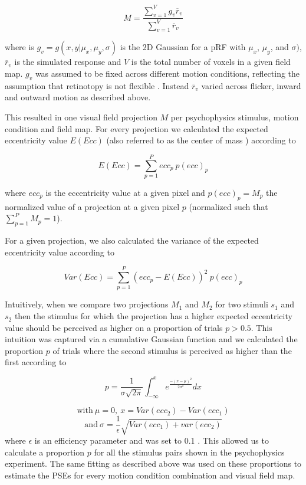 \begin{equation}
M = \frac{\sum_{v=1}^{V} g_v \overline{r}_v}{\sum_{v=1}^{V} \overline{r}_v}
\end{equation}

where is $g_v = g(x, y|\mu_x,\mu_y,\sigma)$ is the 2D Gaussian for a pRF with $\mu_x$, $\mu_y$, and $\sigma)$, $\overline{r}_v$ is the simulated response and $V$ is the total number of voxels in a given field map. $g_v$ was assumed to be fixed across different motion conditions, reflecting the assumption that retinotopy is not flexible \parencite{Liu2006}. Instead $\overline{r}_v$ varied across flicker, inward and outward motion as described above.

This resulted in one visual field projection $M$ per psychophysics stimulus, motion condition and field map. For every projection we calculated the expected eccentricity value $E(Ecc)$ (also referred to as the center of mass \parencite{Liu2006}) according to

\begin{equation}
E(Ecc) = \sum_{p=1}^{P} ecc_p\ p(ecc)_p
\end{equation}

where $ecc_p$ is the eccentricity value at a given pixel and $p(ecc)_p = M_p$ the normalized value of a projection at a given pixel $p$ (normalized such that $\sum_{p=1}^{P} M_p = 1$).

For a given projection, we also calculated the variance of the expected eccentricity value according to

\begin{equation}
Var(Ecc) = \sum_{p=1}^{P} (ecc_p - E(Ecc))^2\ p(ecc)_p
\end{equation}

Intuitively, when we compare two projections $M_1$ and $M_2$ for two stimuli $s_1$ and $s_2$ then the stimulus for which the projection has a higher expected eccentricity value should be perceived as higher on a proportion of trials $p > 0.5$. This intuition was captured via a cumulative Gaussian function \parencite{VanHumbeeck2016} and we calculated the proportion $p$ of trials where the second stimulus is perceived as higher than the first according to

\begin{equation}
p = \frac{1}{\sigma \sqrt{2 \pi}} \int_{-\infty}^{x} e^{\frac{-(x - \mu)^2}{2 \sigma^2}}dx
\end{equation}

$$\textrm{with}\ \mu = 0,\ x = Var(ecc_2) - Var(ecc_1)$$
$$\textrm{and}\ \sigma = \frac{1}{\epsilon}\sqrt{Var(ecc_1) + var(ecc_2)}$$
where $\epsilon$ is an efficiency parameter and was set to 0.1 \parencite{VanHumbeeck2016}. This allowed us to calculate a proportion $p$ for all the stimulus pairs shown in the psychophysics experiment. The same fitting as described above was used on these proportions to estimate the PSEs for every motion condition combination and visual field map.

